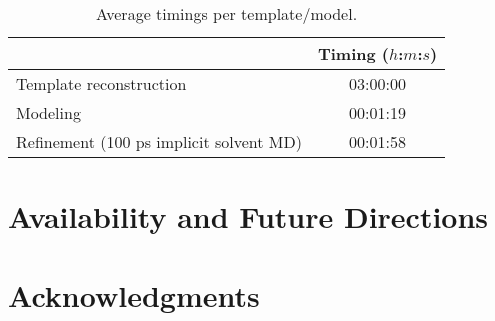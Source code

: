 \documentclass[aps,pre,twocolumn,nofootinbib,superscriptaddress,linenumbers]{revtex4-1}
\begin{document}
\begin{table}
\begin{tabular}{l|c}

    & Timing ($h$:$m$:$s$) \\
    \hline
    Template reconstruction & 03:00:00 \\
    Modeling & 00:01:19 \\
    Refinement (100 ps implicit solvent MD) & 00:01:58 \\

\end{tabular}
\label{tab:timings}
\caption{Average timings per template/model.}
\end{table}

\section{Availability and Future Directions}
\label{section:availability}

\section{Acknowledgments}
\label{section:acknowledgments}


% 

\end{document}
